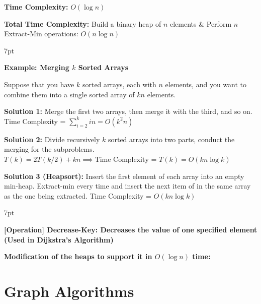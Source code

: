 \documentclass[10pt]{article}
\newenvironment{formal}[2]{%
	\def\FrameCommand{%
		\hspace{1pt}%
		{\color{#1}\vrule width 2pt}%
		{\color{#2}\vrule width 4pt}%
		\colorbox{#2}%
	}%
	\MakeFramed{\advance\hsize-\width\FrameRestore}%
	\noindent\hspace{-4.55pt}%
	\begin{adjustwidth}{}{7pt}%
		\vspace{2pt}\vspace{2pt}%
	}
	{%
		\vspace{2pt}\end{adjustwidth}\endMakeFramed%
}
\begin{document}
\textbf{Time Complexity:} $O(\log n)$

\textbf{Total Time Complexity:} Build a binary heap of $n$ elements \& Perform $n$ Extract-Min operations: $O(n\log n)$

\begin{formal}{Brown}{brownshade}
	
	\textbf{Example: Merging $k$ Sorted Arrays}
	
	Suppose that you have $k$ sorted arrays, each with $n$ elements, and you want to combine them into a single sorted array of $kn$ elements.

\textbf{Solution 1:} Merge the first two arrays, then merge it with the third, and so on. Time Complexity = $\sum_{i=2}^k in = O(k^2 n)$

\textbf{Solution 2:} Divide recursively $k$ sorted arrays into two parts, conduct the merging for the subproblems. $T(k) = 2T(k/2) + kn \implies \text{Time Complexity = }T(k) = O(kn\log k)$

\textbf{Solution 3 (Heapsort):} Insert the first element of each array into an empty min-heap. Extract-min every time and insert the next item of in the same array as the one being extracted. Time Complexity = $O(kn\log k)$

\end{formal}

\begin{formal}{Brown}{brownshade}

	\textbf{[Operation] Decrease-Key: Decreases the value of one specified element (Used in Dijkstra's Algorithm)}
	
\textbf{Modification of the heaps to support it in $O(\log n)$ time:}


	
\end{formal}

























\newpage

\section{Graph Algorithms}
\end{document}
